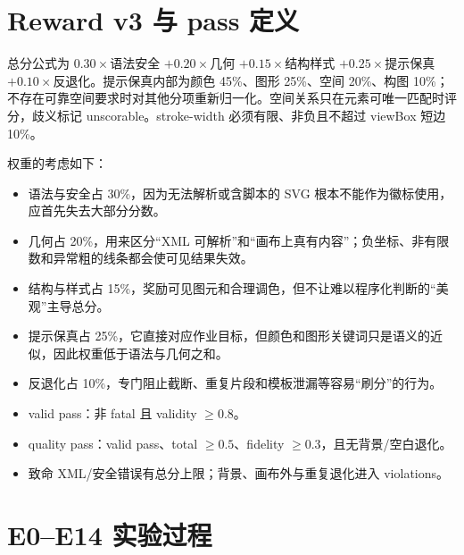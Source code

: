 \documentclass[UTF8,a4paper,zihao=5,fontset=none]{ctexart}
\begin{document}
\section{Reward v3 与 pass 定义}

总分公式为 $0.30\times$语法安全 $+ 0.20\times$几何 $+ 0.15\times$结构样式 $+ 0.25\times$提示保真 $+ 0.10\times$反退化。提示保真内部为颜色 45\%、图形 25\%、空间 20\%、构图 10\%；不存在可靠空间要求时对其他分项重新归一化。空间关系只在元素可唯一匹配时评分，歧义标记 unscorable。stroke-width 必须有限、非负且不超过 viewBox 短边 10\%。

权重的考虑如下：
\begin{itemize}
  \item 语法与安全占 30\%，因为无法解析或含脚本的 SVG 根本不能作为徽标使用，应首先失去大部分分数。
  \item 几何占 20\%，用来区分“XML 可解析”和“画布上真有内容”；负坐标、非有限数和异常粗的线条都会使可见结果失效。
  \item 结构与样式占 15\%，奖励可见图元和合理调色，但不让难以程序化判断的“美观”主导总分。
  \item 提示保真占 25\%，它直接对应作业目标，但颜色和图形关键词只是语义的近似，因此权重低于语法与几何之和。
  \item 反退化占 10\%，专门阻止截断、重复片段和模板泄漏等容易“刷分”的行为。
\end{itemize}

\begin{itemize}
  \item valid pass：非 fatal 且 validity $\geq 0.8$。
  \item quality pass：valid pass、total $\geq 0.5$、fidelity $\geq 0.3$，且无背景/空白退化。
  \item 致命 XML/安全错误有总分上限；背景、画布外与重复退化进入 violations。
\end{itemize}

\section{E0--E14 实验过程}
\end{document}
